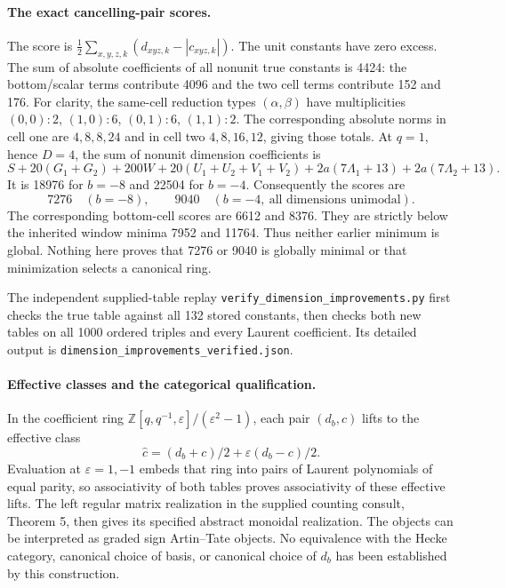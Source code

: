 \paragraph{The exact cancelling-pair scores.}
The score is $\frac12\sum_{x,y,z,k}(d_{xyz,k}-|c_{xyz,k}|)$.
The unit constants have zero excess.  The sum of absolute coefficients
of all nonunit true constants is 4424: the bottom/scalar terms
contribute 4096 and the two cell terms contribute 152 and 176.
For clarity, the same-cell reduction types $(\alpha,\beta)$ have
multiplicities $(0,0):2$, $(1,0):6$, $(0,1):6$, $(1,1):2$.
The corresponding absolute norms in cell one are $4,8,8,24$ and in
cell two $4,8,16,12$, giving those totals.
At $q=1$, hence $D=4$, the sum of nonunit dimension coefficients is
\[
 S+20(G_1+G_2)+200W+20(U_1+U_2+V_1+V_2)
   +2a(7\Lambda_1+13)+2a(7\Lambda_2+13).
 \tag{N-14}
\]
It is 18976 for $b=-8$ and 22504 for $b=-4$.  Consequently the scores are
\[
 \boxed{7276\quad(b=-8)},\qquad
 \boxed{9040\quad(b=-4,\ \text{all dimensions unimodal})}.
 \tag{N-15}
\]
The corresponding bottom-cell scores are 6612 and 8376.
They are strictly below the inherited window minima 7952 and 11764.
Thus neither earlier minimum is global.  Nothing here proves that
7276 or 9040 is globally minimal or that minimization selects a
canonical ring.

The independent supplied-table replay
\nolinkurl{verify_dimension_improvements.py} first checks the true table
against all 132 stored constants, then checks both new tables on all
1000 ordered triples and every Laurent coefficient.  Its detailed
output is \nolinkurl{dimension_improvements_verified.json}.

\paragraph{Effective classes and the categorical qualification.}
In the coefficient ring
$\mathbb Z[q,q^{-1},\varepsilon]/(\varepsilon^2-1)$, each pair
$(d_b,c)$ lifts to the effective class
\[
                 \widehat c=(d_b+c)/2+\varepsilon(d_b-c)/2.
\]
Evaluation at $\varepsilon=1,-1$ embeds that ring into pairs of
Laurent polynomials of equal parity, so associativity of both tables
proves associativity of these effective lifts.  The left regular
matrix realization in the supplied counting consult, Theorem 5,
then gives its specified abstract monoidal realization.  The objects
can be interpreted as graded sign Artin--Tate objects.  No equivalence
with the Hecke category, canonical choice of basis, or canonical
choice of $d_b$ has been established by this construction.

